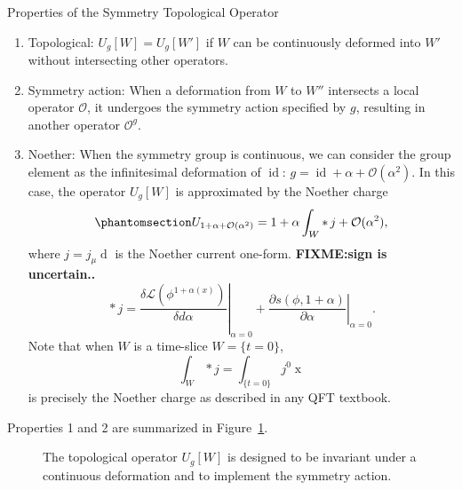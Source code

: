 \documentclass[11pt,toc=bibliography]{scrbook}
\DeclareMathOperator{\id}{id}
\newcommand{\stdim}{D}
\numberwithin{equation}{section}
\providecommand{\tightlist}{%
  \setlength{\itemsep}{0pt}\setlength{\parskip}{0pt}}
\DeclareMathOperator{\id}{id}
\newcommand{\stdim}{D}
\begin{document}
\begin{important}{Properties of the Symmetry Topological Operator}

\begin{enumerate}
\def\labelenumi{\arabic{enumi}.}
\tightlist
\item
  Topological: \(U_g[W] = U_g[W']\) if \(W\) can be continuously
  deformed into \(W'\) without intersecting other operators.
\item
  Symmetry action: When a deformation from \(W\) to \(W''\) intersects a
  local operator \(\mathcal{O}\), it undergoes the symmetry action
  specified by \(g\), resulting in another operator \(\mathcal{O}^g\).
\item
  Noether: When the symmetry group is continuous, we can consider the
  group element as the infinitesimal deformation of \(\id\):
  \(g = \id + \alpha + \mathcal{O}(\alpha^2)\). In this case, the
  operator \(U_g[W]\) is approximated by the Noether charge
  \begin{equation}\phantomsection\label{eq-Noether-approx}{
   U_{1+\alpha+\mathcal{O}(\alpha^2)} = 1 + \alpha \int_W \mathop{*}j +\mathcal{O}(\alpha^2),
   }\end{equation} where \(j = j_\mu\mathop{dx^\mu}\) is the Noether
  current one-form. \textbf{FIXME:sign is uncertain..} \[
   \mathop{*}j = \left.\frac{\delta\mathcal{L}(\phi^{1+\alpha(x)})}{\delta d\alpha}\right|_{\alpha=0} + \left.\frac{\partial s(\phi, 1+ \alpha)}{\partial \alpha}\right|_{\alpha=0}.
   \] Note that when \(W\) is a time-slice \(W=\{t=0\}\), \[
  \int_W \mathop{*} j = \int_{\{t=0\}} j^0 \mathop{d^{\stdim-1}x}
  \] is precisely the Noether charge as described in any QFT textbook.
\end{enumerate}

Properties 1 and 2 are summarized in Figure~\ref{fig-op-action}.

\end{important}

\begin{figure}[t]


\caption{\label{fig-op-action}The topological operator \(U_g[W]\) is
designed to be invariant under a continuous deformation and to implement
the symmetry action.}

\end{figure}%
\end{document}
